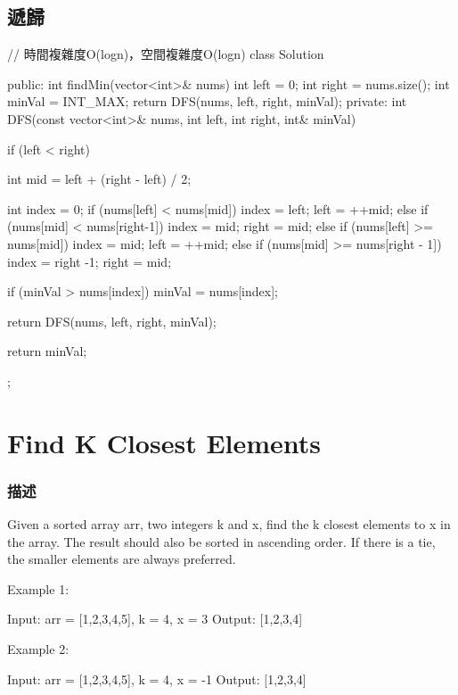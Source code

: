 \subsection{遞歸}
\begin{Code}
// 時間複雜度O(logn)，空間複雜度O(logn)
class Solution {
public:
    int findMin(vector<int>& nums) {
        int left = 0;
        int right = nums.size();
        int minVal = INT_MAX;
        return DFS(nums, left, right, minVal);
    }
private:
    int DFS(const vector<int>& nums, int left, int right, int& minVal) {
        if (left < right) {
            int mid = left + (right - left) / 2;

            int index = 0;
            if (nums[left] < nums[mid]) {
                index = left;
                left = ++mid;
            }
            else if (nums[mid] < nums[right-1]) {
                index = mid;
                right = mid;
            }
            else if (nums[left] >= nums[mid]) {
                index = mid;
                left = ++mid;
            }
            else if (nums[mid] >= nums[right - 1]) {
                index = right -1;
                right = mid;
            }

            if (minVal > nums[index])
                minVal = nums[index];

            return DFS(nums, left, right, minVal);
        }
        return minVal;
    }
};
\end{Code}

\section{Find K Closest Elements} %
\label{sec:find-k-closest-elements}


\subsubsection{描述}
Given a sorted array arr, two integers k and x, find the k closest elements to x in the array. The result should also be sorted in ascending order. If there is a tie, the smaller elements are always preferred.

Example 1:
\begin{Code}
Input: arr = [1,2,3,4,5], k = 4, x = 3
Output: [1,2,3,4]
\end{Code}

Example 2:
\begin{Code}
Input: arr = [1,2,3,4,5], k = 4, x = -1
Output: [1,2,3,4]
\end{Code}

